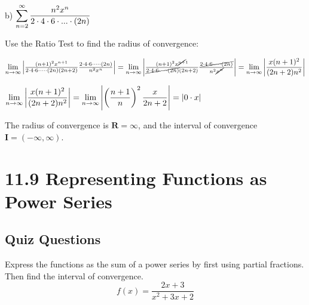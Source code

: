 \documentclass[12pt]{article}
\newcommand{\inftylim}[1]{\mathlarger{\lim_{n \to \infty}#1}}
\newcommand{\smallinftylim}[1]{\lim\limits_{n \to \infty} #1}
\begin{document}
\begin{solution}
b) $\mathlarger{\sum_{n=2}^{\infty} \frac{n^{2}x^{n}}{2\cdot 4 \cdot 6 \cdot ... \cdot (2n)}}$

Use the Ratio Test to find the radius of convergence:

$ \smallinftylim{ \left|\frac{(n + 1)^{2}x^{n + 1}}{2\cdot 4 \cdot 6 \cdot \dots \cdot (2n)(2n + 2)} \frac{2\cdot 4 \cdot 6 \cdot \dots \cdot (2n)}{n^2x^{n}} \right|} = \smallinftylim{\left|\frac{(n + 1)^{2}x^{\cancel{n +} 1}}{\cancel{2\cdot 4 \cdot 6 \cdot \dots \cdot (2n)}(2n + 2)} \frac{\cancel{2\cdot 4 \cdot 6 \cdot \dots \cdot (2n)}}{n^2\cancel{x^{n}}} \right|} = \inftylim{ \left| \frac{x(n + 1)^2}{(2n + 2)n^2} \right| } $

$\inftylim{ \left| \frac{x(n + 1)^2}{(2n + 2)n^2} \right| } = \inftylim{ \left| \left(\frac{n + 1}{n}\right)^2 \frac{x}{2n + 2} \right| } = \left|0 \cdot x \right|$ 

The radius of convergence is $\mathbf{R = \infty}$, and the interval of convergence $\mathbf{I = \left(-\infty, \infty \right)}$. 
\end{solution}

\pagebreak



\section*{11.9 Representing Functions as Power Series}

\subsection*{Quiz Questions}

Express the functions as the sum of a power series by first using partial fractions. Then find the interval of convergence.
$$ f(x) = \frac{2x + 3}{x^2+3x+2} $$
\end{document}
